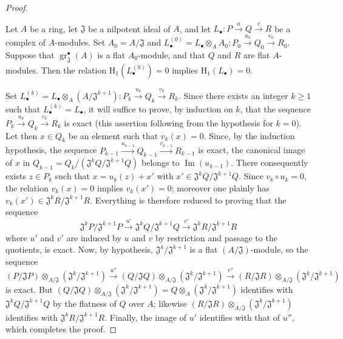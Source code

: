 \begin{proof}
\begin{lemma}[12.3.3.5]
\label{IV.12.3.3.5}
Let $A$ be a ring, let $\mathfrak{J}$ be a nilpotent ideal of $A$, and let
$L_\bullet:P\xrightarrow{u}Q\xrightarrow{v}R$ be a complex of $A$-modules.
Set $A_0=A/\mathfrak{J}$ and
$L_\bullet^{(0)}=L_\bullet\otimes_A A_0:P_0\xrightarrow{u_0}Q_0\xrightarrow{v_0}R_0$.
Suppose that $\operatorname{gr}_{\mathfrak{J}}^{\bullet}(A)$ is a flat $A_0$-module, and that $Q$ and $R$ are flat $A$-modules.
Then the relation $\mathrm{H}_1(L_\bullet^{(0)})=0$ implies $\mathrm{H}_1(L_\bullet)=0$.
\end{lemma}

Set
$L_\bullet^{(k)}=L_\bullet\otimes_A(A/\mathfrak{J}^{k+1}):P_k\xrightarrow{u_k}Q_k\xrightarrow{v_k}R_k$.
Since there exists an integer $k\geqslant 1$ such that $L_\bullet^{(k)}=L_\bullet$, it will suffice to prove, by induction on $k$, that the sequence
$P_k\xrightarrow{u_k}Q_k\xrightarrow{v_k}R_k$ is
exact (this assertion following from the hypothesis for $k=0$).
Let then $x\in Q_k$ be an element such that $v_k(x)=0$.
Since, by the induction hypothesis, the sequence
$P_{k-1}\xrightarrow{u_{k-1}}Q_{k-1}\xrightarrow{v_{k-1}}R_{k-1}$ is exact, the canonical image of $x$ in
$Q_{k-1}=Q_k/(\mathfrak{J}^kQ/\mathfrak{J}^{k+1}Q)$ belongs to $\operatorname{Im}(u_{k-1})$.
There consequently exists $z\in P_k$ such that
$x=u_k(z)+x'$ with $x'\in\mathfrak{J}^kQ/\mathfrak{J}^{k+1}Q$.
Since $v_k\circ u_k=0$, the relation $v_k(x)=0$ implies $v_k(x')=0$; moreover one plainly has
$v_k(x')\in\mathfrak{J}^kR/\mathfrak{J}^{k+1}R$.
Everything is therefore reduced to proving that the sequence
\[
  \mathfrak{J}^kP/\mathfrak{J}^{k+1}P
  \xrightarrow{u'}
  \mathfrak{J}^kQ/\mathfrak{J}^{k+1}Q
  \xrightarrow{v'}
  \mathfrak{J}^kR/\mathfrak{J}^{k+1}R
\]
where $u'$ and $v'$ are induced by $u$ and $v$ by restriction and passage to the quotients, is exact.
Now, by hypothesis, $\mathfrak{J}^k/\mathfrak{J}^{k+1}$ is a flat $(A/\mathfrak{J})$-module, so the sequence
\[
  (P/\mathfrak{J}P)\otimes_{A/\mathfrak{J}}(\mathfrak{J}^k/\mathfrak{J}^{k+1})
  \xrightarrow{u''}
  (Q/\mathfrak{J}Q)\otimes_{A/\mathfrak{J}}(\mathfrak{J}^k/\mathfrak{J}^{k+1})
  \xrightarrow{v''}
  (R/\mathfrak{J}R)\otimes_{A/\mathfrak{J}}(\mathfrak{J}^k/\mathfrak{J}^{k+1})
\]
is exact.
But
$(Q/\mathfrak{J}Q)\otimes_{A/\mathfrak{J}}(\mathfrak{J}^k/\mathfrak{J}^{k+1})
=Q\otimes_A(\mathfrak{J}^k/\mathfrak{J}^{k+1})$
identifies with $\mathfrak{J}^kQ/\mathfrak{J}^{k+1}Q$ by the flatness of $Q$ over $A$; likewise
$(R/\mathfrak{J}R)\otimes_{A/\mathfrak{J}}(\mathfrak{J}^k/\mathfrak{J}^{k+1})$
identifies with $\mathfrak{J}^kR/\mathfrak{J}^{k+1}R$.
Finally, the image of $u'$ identifies with that of $u''$, which completes the proof.
\end{proof}


